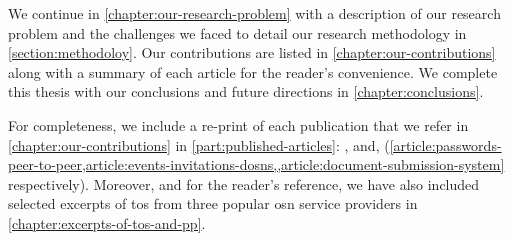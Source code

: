 \documentclass[showtrims, oldfontcommands]{kthesis}
\begin{document}
We continue in \cref{chapter:our-research-problem} with a description of our research 
problem and the challenges we faced to detail our research methodology 
in \cref{section:methodoloy}. Our contributions are listed in \cref{chapter:our-contributions} 
along with a summary of each article for the reader's convenience. We complete this 
thesis with our conclusions and future directions in \cref{chapter:conclusions}.

For completeness, we include a re-print of each publication that we refer in \cref{chapter:our-contributions} 
in \cref{part:published-articles}: ,  
and,  (\cref{article:passwords-peer-to-peer,article:events-invitations-dosns,,article:document-submission-system} 
respectively). Moreover, and for the reader's reference, we have also included selected 
excerpts of \ac{tos} from three popular \ac{osn} service providers in \cref{chapter:excerpts-of-tos-and-pp}.
\end{document}
